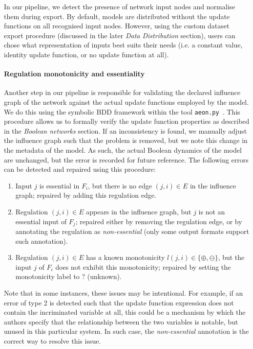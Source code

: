 \documentclass[fleqn,10pt]{wlscirep}
\begin{document}
In our pipeline, we detect the presence of network input nodes and normalise them during export. By default, models are distributed without the update functions on all recognised input nodes. However, using the custom dataset export procedure (discussed in the later \emph{Data Distribution} section), users can chose what representation of inputs best suits their needs (i.e. a constant value, identity update function, or no update function at all).

\paragraph*{Regulation monotonicity and essentiality}

Another step in our pipeline is responsible for validating the declared influence graph of the network against the actual update functions employed by the model. We do this using the symbolic BDD framework within the tool \texttt{aeon.py}~\cite{aeonpy}. This procedure allows us to formally verify the update function properties as described in the \emph{Boolean networks} section. If an inconsistency is found, we manually adjust the influence graph such that the problem is removed, but we note this change in the metadata of the model. As such, the actual Boolean dynamics of the model are unchanged, but the error is recorded for future reference. The following errors can be detected and repaired using this procedure:

\begin{enumerate}
	\item Input $j$ is essential in $F_i$, but there is no edge $(j,i) \in E$ in the influence graph; repaired by adding this regulation edge.
	\item Regulation $(j,i) \in E$ appears in the influence graph, but $j$ is not an essential input of $F_j$; repaired either by removing the regulation edge, or by annotating the regulation as \emph{non-essential} (only some output formats support such annotation).
	\item Regulation $(j,i) \in E$ has a known monotonicity $l(j,i) \in \{\oplus, \ominus\}$, but the input $j$ of $F_i$ does not exhibit this monotonicity; repaired by setting the monotonicity label to $?$ (unknown).
\end{enumerate}

Note that in some instances, these issues may be intentional. For example, if an error of type 2 is detected such that the update function expression does not contain the incriminated variable at all, this could be a mechanism by which the authors specify that the relationship between the two variables is notable, but unused in this particular system. In such case, the \emph{non-essential} annotation is the correct way to resolve this issue.
\end{document}
